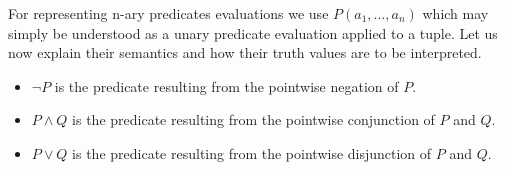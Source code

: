 \documentclass[runningheads]{llncs}
\newcommand{\SP}{\;\;\;}
\newcommand{\TAnd}{\textit{And}}
\newcommand{\TNot}{\textit{Not}}
\newcommand{\TTV}{\textit{TV}}
\newcommand{\TBTV}{\langle \TTV \rangle}
\newcommand{\prob}{\mathcal{Pr}}
\begin{document}
For representing n-ary predicates evaluations we use
$P(a_1, \dots, a_n)$ which may simply be understood as a unary
predicate evaluation applied to a tuple.  Let us now explain their
semantics and how their truth values are to be interpreted.
\begin{itemize}
\item $\lnot P$ is the predicate resulting from the pointwise negation
  of $P$.
\item
  $P \land Q$ is the predicate resulting from the pointwise
  conjunction of $P$ and $Q$.
\item
  $P \lor Q$ is the predicate resulting from the pointwise disjunction
  of $P$ and $Q$.

\end{itemize}
\end{document}
